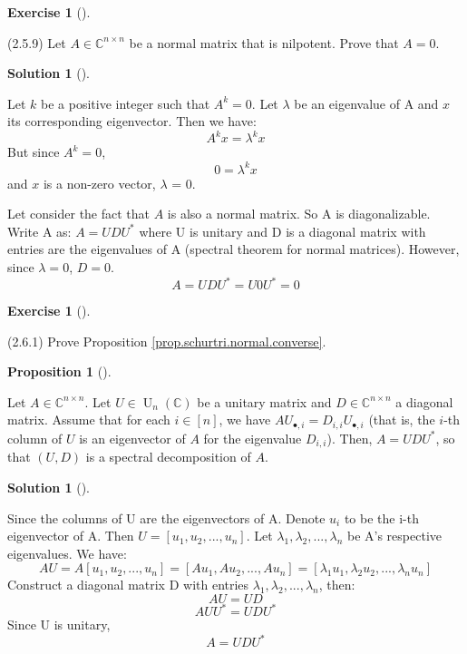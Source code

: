 \documentclass[numbers=enddot,12pt,final,onecolumn,notitlepage]{scrartcl}
\newcounter{exer}
\newcounter{sol}
\theoremstyle{definition}
\newtheorem{prop}[theo]{Proposition}
\newenvironment{proposition}[1][]
{\begin{prop}[#1]\begin{leftbar}}
        {\end{leftbar}\end{prop}}
\newtheorem{exmp}[exer]{Exercise}
\newenvironment{exercise}[1][]
{\begin{exmp}[#1]\begin{leftbar}}
        {\end{leftbar}\end{exmp}}
\newtheorem{solu}[sol]{Solution}
\newenvironment{solution}[1][]
{\begin{solu}[#1]\begin{leftbar}}
        {\end{leftbar}\end{solu}}
\begin{document}
\begin{exercise}
	\label{exe.schurtri.normal.nilp} (2.5.9) Let $A\in\mathbb{C}^{n\times n}$ be a
	normal matrix that is nilpotent. Prove that $A=0$.
\end{exercise}

\begin{solution}
	Let $k$ be a positive integer such that $A^k = 0$. Let $\lambda$ be an eigenvalue of A and $x$ its corresponding eigenvector. Then we have:
	\[
		A^kx = \lambda^kx
	\]
	But since $A^k = 0$,
	\[
		0 = \lambda^kx
	\]
	and $x$ is a non-zero vector, $\lambda$ = 0.

	Let consider the fact that $A$ is also a normal matrix. So A is diagonalizable. Write A as: $A = UDU^{\ast}$ where U is unitary and D is a diagonal matrix with entries are the eigenvalues of A (spectral theorem for normal matrices). However, since $\lambda = 0$, $D = 0$.
	\[
		A = UDU^{\ast} = U0U^{\ast} = 0
	\]
\end{solution}

\begin{exercise}
	 (2.6.1) Prove Proposition \ref{prop.schurtri.normal.converse}.

	\begin{proposition}
		\label{prop.schurtri.normal.converse}Let $A\in\mathbb{C}^{n\times n}$. Let
		$U\in\operatorname*{U}\nolimits_{n}\left(  \mathbb{C}\right)  $ be a unitary
		matrix and $D\in\mathbb{C}^{n\times n}$ a diagonal matrix. Assume that for
		each $i\in\left[  n\right]  $, we have $AU_{\bullet,i}=D_{i,i}U_{\bullet,i}$
		(that is, the $i$-th column of $U$ is an eigenvector of $A$ for the eigenvalue
		$D_{i,i}$). Then, $A=UDU^{\ast}$, so that $\left(  U,D\right)  $ is a spectral
		decomposition of $A$.
	\end{proposition}
\end{exercise}

\begin{solution}
	Since the columns of U are the eigenvectors of A. Denote $u_i$ to be the i-th eigenvector of A. Then $U = [u_1, u_2,...,u_n]$. Let $\lambda_1, \lambda_2,...,\lambda_n$ be A's respective eigenvalues. We have:
	\[
		AU = A[u_1, u_2,...,u_n] = [Au_1, Au_2,...,Au_n] = [\lambda_1u_1, \lambda_2u_2,...,\lambda_nu_n]
	\]
	Construct a diagonal matrix D with entries $\lambda_1, \lambda_2,...,\lambda_n$, then:
	\[
		AU = UD
	\]
	\[
		AUU^{\ast} = UDU^{\ast}
	\]
	Since U is unitary,
	\[
		A = UDU^{\ast}
	\]

\end{solution}
\end{document}
